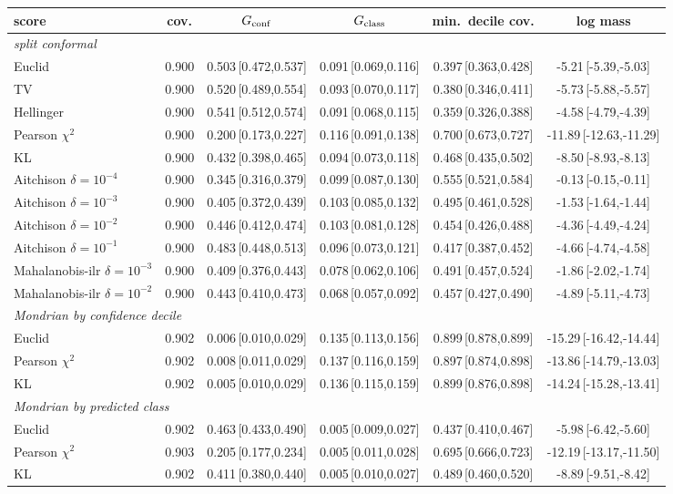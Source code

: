 \begin{tabular}{lccccc}\toprule
score & cov. & $G_{\rm conf}$ & $G_{\rm class}$ & min.\ decile cov. & log mass\\\midrule
\multicolumn{6}{l}{\emph{split conformal}}\\
Euclid & 0.900 & 0.503\,[0.472,0.537] & 0.091\,[0.069,0.116] & 0.397\,[0.363,0.428] & -5.21\,[-5.39,-5.03]\\
TV & 0.900 & 0.520\,[0.489,0.554] & 0.093\,[0.070,0.117] & 0.380\,[0.346,0.411] & -5.73\,[-5.88,-5.57]\\
Hellinger & 0.900 & 0.541\,[0.512,0.574] & 0.091\,[0.068,0.115] & 0.359\,[0.326,0.388] & -4.58\,[-4.79,-4.39]\\
Pearson $\chi^2$ & 0.900 & 0.200\,[0.173,0.227] & 0.116\,[0.091,0.138] & 0.700\,[0.673,0.727] & -11.89\,[-12.63,-11.29]\\
KL & 0.900 & 0.432\,[0.398,0.465] & 0.094\,[0.073,0.118] & 0.468\,[0.435,0.502] & -8.50\,[-8.93,-8.13]\\
Aitchison $\delta{=}10^{-4}$ & 0.900 & 0.345\,[0.316,0.379] & 0.099\,[0.087,0.130] & 0.555\,[0.521,0.584] & -0.13\,[-0.15,-0.11]\\
Aitchison $\delta{=}10^{-3}$ & 0.900 & 0.405\,[0.372,0.439] & 0.103\,[0.085,0.132] & 0.495\,[0.461,0.528] & -1.53\,[-1.64,-1.44]\\
Aitchison $\delta{=}10^{-2}$ & 0.900 & 0.446\,[0.412,0.474] & 0.103\,[0.081,0.128] & 0.454\,[0.426,0.488] & -4.36\,[-4.49,-4.24]\\
Aitchison $\delta{=}10^{-1}$ & 0.900 & 0.483\,[0.448,0.513] & 0.096\,[0.073,0.121] & 0.417\,[0.387,0.452] & -4.66\,[-4.74,-4.58]\\
Mahalanobis-ilr $\delta{=}10^{-3}$ & 0.900 & 0.409\,[0.376,0.443] & 0.078\,[0.062,0.106] & 0.491\,[0.457,0.524] & -1.86\,[-2.02,-1.74]\\
Mahalanobis-ilr $\delta{=}10^{-2}$ & 0.900 & 0.443\,[0.410,0.473] & 0.068\,[0.057,0.092] & 0.457\,[0.427,0.490] & -4.89\,[-5.11,-4.73]\\
\multicolumn{6}{l}{\emph{Mondrian by confidence decile}}\\
Euclid & 0.902 & 0.006\,[0.010,0.029] & 0.135\,[0.113,0.156] & 0.899\,[0.878,0.899] & -15.29\,[-16.42,-14.44]\\
Pearson $\chi^2$ & 0.902 & 0.008\,[0.011,0.029] & 0.137\,[0.116,0.159] & 0.897\,[0.874,0.898] & -13.86\,[-14.79,-13.03]\\
KL & 0.902 & 0.005\,[0.010,0.029] & 0.136\,[0.115,0.159] & 0.899\,[0.876,0.898] & -14.24\,[-15.28,-13.41]\\
\multicolumn{6}{l}{\emph{Mondrian by predicted class}}\\
Euclid & 0.902 & 0.463\,[0.433,0.490] & 0.005\,[0.009,0.027] & 0.437\,[0.410,0.467] & -5.98\,[-6.42,-5.60]\\
Pearson $\chi^2$ & 0.903 & 0.205\,[0.177,0.234] & 0.005\,[0.011,0.028] & 0.695\,[0.666,0.723] & -12.19\,[-13.17,-11.50]\\
KL & 0.902 & 0.411\,[0.380,0.440] & 0.005\,[0.010,0.027] & 0.489\,[0.460,0.520] & -8.89\,[-9.51,-8.42]\\
\bottomrule\end{tabular}
